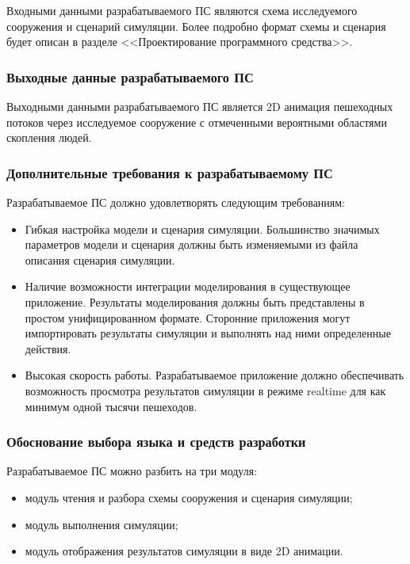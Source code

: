 Входными данными разрабатываемого ПС являются схема исследуемого сооружения и сценарий симуляции.
Более подробно формат схемы и сценария будет описан в разделе <<Проектирование программного средства>>.

\subsubsection{Выходные данные разрабатываемого ПС}
\label{sub:domain:requirements:purpose}

Выходными данными разрабатываемого ПС является 2D анимация пешеходных потоков через исследуемое сооружение с отмеченными вероятными областями скопления людей.

\subsubsection{Дополнительные требования к разрабатываемому ПС}
\label{sub:domain:requirements:purpose}

Разрабатываемое ПС должно удовлетворять следующим требованиям:
\begin{itemize}
  \item Гибкая настройка модели и сценария симуляции.
        Большинство значимых параметров модели и сценария должны быть изменяемыми из файла описания сценария симуляции.
  \item Наличие возможности интеграции моделирования в существующее приложение.
        Результаты моделирования должны быть представлены в простом унифицированном формате.
        Сторонние приложения могут импортировать результаты симуляции и выполнять над ними определенные действия.
  \item Высокая скорость работы.
        Разрабатываемое приложение должно обеспечивать возможность просмотра результатов симуляции в режиме realtime для как минимум одной тысячи пешеходов.
\end{itemize}

\subsubsection{Обоснование выбора языка и средств разработки}
\label{sub:domain:requirements:purpose}

Разрабатываемое ПС можно разбить на три модуля:
\begin{itemize}
  \item модуль чтения и разбора схемы сооружения и сценария симуляции;
  \item модуль выполнения симуляции;
  \item модуль отображения результатов симуляции в виде 2D анимации.
\end{itemize}

